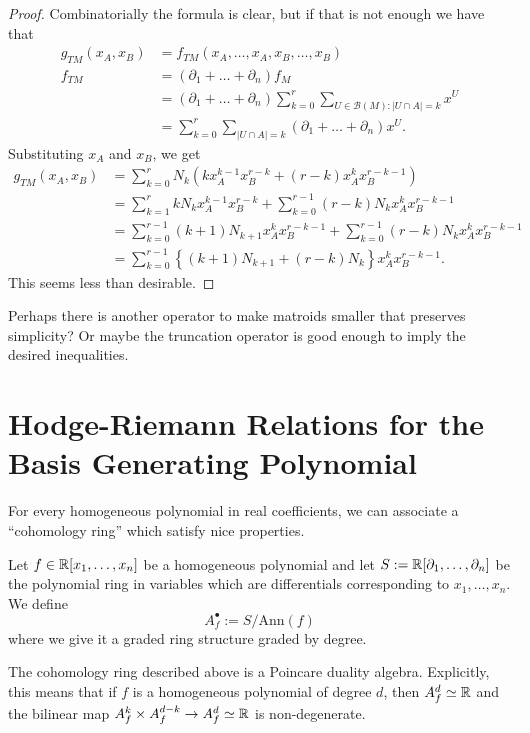\documentclass[12pt]{article}
\begin{document}
\begin{proof}
	Combinatorially the formula is clear, but if that is not enough we have that 
	\begin{align*}
		g_{TM}(x_A, x_B) & = f_{TM}(x_A, \ldots, x_A, x_B, \ldots, x_B) \\
		f_{TM} & = (\partial_1 + \ldots + \partial_n) f_M \\
		& = (\partial_1 + \ldots + \partial_n) \sum_{k = 0}^r \sum_{U \in \mathcal{B}(M): |U \cap A| = k} x^U \\
		& = \sum_{k = 0}^r \sum_{|U \cap A| = k} (\partial_1 + \ldots + \partial_n) x^U. 
	\end{align*}
	Substituting $x_A$ and $x_B$, we get 
	\begin{align*}
		g_{TM}(x_A, x_B) & = \sum_{k = 0}^r N_k (kx_A^{k-1} x_B^{r-k} + (r-k)x_A^k x_B^{r-k-1}) \\
		& = \sum_{k = 1}^r k N_k x_A^{k-1} x_B^{r-k} + \sum_{k = 0}^{r-1} (r-k)N_k x_A^k x_B^{r-k-1} \\
		& = \sum_{k = 0}^{r-1} (k+1)N_{k+1} x_A^k x_B^{r-k-1} + \sum_{k =0}^{r-1} (r-k) N_k x_A^k x_B^{r-k-1} \\
		& = \sum_{k = 0}^{r-1} \left \{ (k+1)N_{k+1} + (r-k) N_k\right \} x_A^k x_B^{r-k-1}.
	\end{align*}
	This seems less than desirable.
\end{proof}
Perhaps there is another operator to make matroids smaller that preserves simplicity? Or maybe the truncation operator is good enough to imply the desired inequalities. 

\section{Hodge-Riemann Relations for the Basis Generating Polynomial}

For every homogeneous polynomial in real coefficients, we can associate a ``cohomology ring'' which satisfy nice properties. 

\begin{defn}
	Let $f \in \mathbb{R}[x_1, \ldots, x_n]$ be a homogeneous polynomial and let $S := \mathbb{R} [ \partial_1, \ldots, \partial_n]$ be the polynomial ring in variables which are differentials corresponding to $x_1, \ldots, x_n$. We define 
	\[
		A^\bullet_f := S / \text{Ann}(f)
	\]
	where we give it a graded ring structure graded by degree. 
\end{defn}

The cohomology ring described above is a Poincare duality algebra. Explicitly, this means that if $f$ is a homogeneous polynomial of degree $d$, then $A^d_f \simeq \mathbb{R}$ and the bilinear map $A_f^k \times A_f^{d-k} \to A_f^d \simeq \mathbb{R}$ is non-degenerate. 
\end{document}

